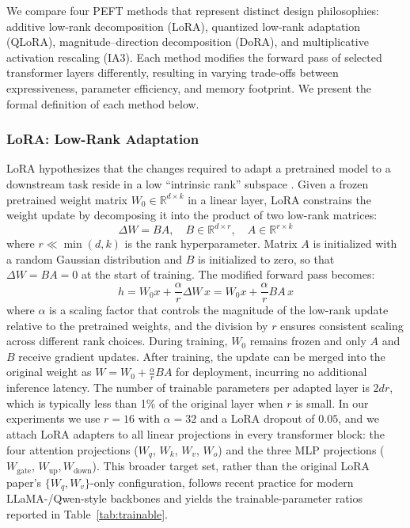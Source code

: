 \documentclass{article}
\begin{document}
We compare four PEFT methods that represent distinct design philosophies: additive low-rank decomposition (LoRA), quantized low-rank adaptation (QLoRA), magnitude--direction decomposition (DoRA), and multiplicative activation rescaling (IA3). Each method modifies the forward pass of selected transformer layers differently, resulting in varying trade-offs between expressiveness, parameter efficiency, and memory footprint. We present the formal definition of each method below.

\subsubsection{LoRA: Low-Rank Adaptation}

LoRA hypothesizes that the changes required to adapt a pretrained model to a downstream task reside in a low ``intrinsic rank'' subspace \cite{hu2022lora}. Given a frozen pretrained weight matrix $W_0 \in \mathbb{R}^{d \times k}$ in a linear layer, LoRA constrains the weight update by decomposing it into the product of two low-rank matrices:
\begin{equation}
\label{eq:lora_decomp}
\Delta W = BA, \quad B \in \mathbb{R}^{d \times r}, \quad A \in \mathbb{R}^{r \times k}
\end{equation}
where $r \ll \min(d, k)$ is the rank hyperparameter. Matrix $A$ is initialized with a random Gaussian distribution and $B$ is initialized to zero, so that $\Delta W = BA = 0$ at the start of training. The modified forward pass becomes:
\begin{equation}
\label{eq:lora_forward}
h = W_0 x + \frac{\alpha}{r} \Delta W \, x = W_0 x + \frac{\alpha}{r} BA \, x
\end{equation}
where $\alpha$ is a scaling factor that controls the magnitude of the low-rank update relative to the pretrained weights, and the division by $r$ ensures consistent scaling across different rank choices. During training, $W_0$ remains frozen and only $A$ and $B$ receive gradient updates. After training, the update can be merged into the original weight as $W = W_0 + \frac{\alpha}{r} BA$ for deployment, incurring no additional inference latency. The number of trainable parameters per adapted layer is $2dr$, which is typically less than 1\% of the original layer when $r$ is small. In our experiments we use $r = 16$ with $\alpha = 32$ and a LoRA dropout of $0.05$, and we attach LoRA adapters to all linear projections in every transformer block: the four attention projections ($W_q$, $W_k$, $W_v$, $W_o$) and the three MLP projections ($W_{\text{gate}}$, $W_{\text{up}}, W_{\text{down}}$). This broader target set, rather than the original LoRA paper's $\{W_q, W_v\}$-only configuration, follows recent practice for modern LLaMA-/Qwen-style backbones and yields the trainable-parameter ratios reported in Table~\ref{tab:trainable}.
\end{document}
